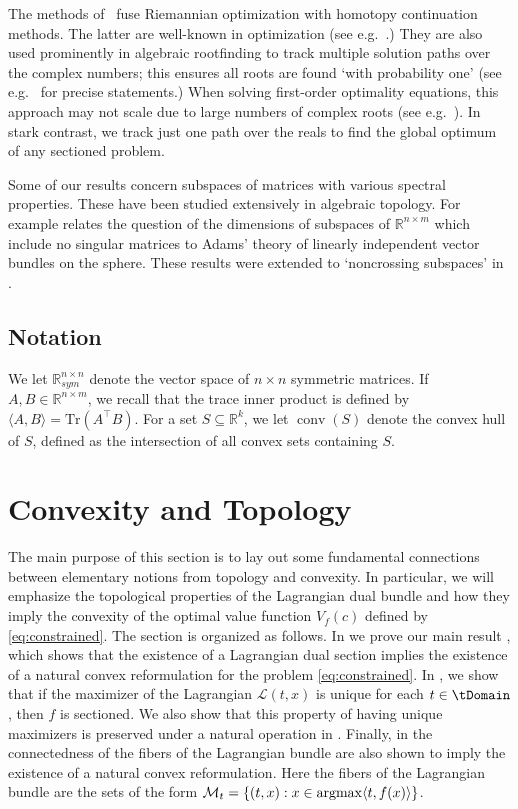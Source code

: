\documentclass{article}
\numberwithin{equation}{section}
\newcommand{\tr}{\mathrm{Tr}}
\newcommand{\R}{\mathbb{R}}
\DeclareMathOperator*{\conv}{conv}
\newcommand{\argmax}{\operatornamewithlimits{argmax}}
\newcommand{\cM}{{\mathcal{M}}}
\begin{document}
The methods of~ fuse Riemannian optimization with homotopy continuation methods. The latter are well-known in optimization (see e.g.~\cite[\S 11.3]{nocedal2006numerical}.) 
They are also used prominently in algebraic rootfinding to track multiple solution paths over the complex numbers; this ensures all roots are found `with probability one' (see e.g.~\cite[Ch.~4 \& 7]{sommese-wampler} for precise statements.)
When solving first-order optimality equations, this approach may not scale due to large numbers of complex roots (see e.g.~\cite{dhost,nie-ranestad}).
In stark contrast, we track just one path over the reals to find the global optimum of any sectioned problem.

Some of our results concern subspaces of matrices with various spectral properties. These have been studied extensively in algebraic topology.  For example \cite{adams1965matrices} relates the question of the dimensions of subspaces of $\R^{n\times m}$ which include no singular matrices to Adams' theory of linearly independent vector bundles on the sphere. These results were extended to `noncrossing subspaces' in \cite{crossing}.

\subsection{Notation} 

We let $\R_{sym}^{n\times n}$ denote the vector space of $n\times n$ symmetric matrices. If $A, B \in \R^{n\times m}$, we recall that the trace inner product is defined by $\langle A, B\rangle = \tr(A^{\intercal}B)$. For a set $S \subseteq \R^k$, we let $\conv(S)$ denote the convex hull of $S$, defined as the intersection of all convex sets containing $S$.

\section{Convexity and Topology}\label{sec:convexity-topology}

The main purpose of this section is to lay out some fundamental connections between elementary notions from topology and convexity.
In particular, we will emphasize the topological properties of the Lagrangian dual bundle and how they imply the convexity of the optimal value function $V_f(c)$ defined by \eqref{eq:constrained}.  The section is organized as follows.  In  we prove our main result , which shows that the existence of a Lagrangian dual section implies the existence of a natural convex reformulation for the problem \eqref{eq:constrained}.  In , we show that if the maximizer of the Lagrangian $\mathcal{L}(t,x)$ is unique for each $t \in \tDomain$, then $f$ is sectioned.  We also show that this property of having unique maximizers is preserved under a natural operation in .
Finally, in  the connectedness of the fibers of the Lagrangian bundle are also shown to imply the existence of a natural convex reformulation. Here the fibers of the Lagrangian bundle are the sets of the form $\cM_t = \{(t,x) : x \in \argmax \langle t, f(x)\rangle\}$.
\end{document}
